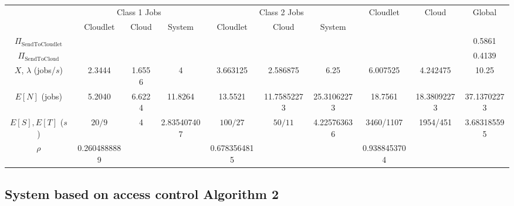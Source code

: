 \documentclass[10pt,a4paper]{article}
\begin{document}
\begin{table}[h!]
    \centering
    \small
    \begin{adjustbox}{center=\textwidth}
     \begin{tabular}{c|c|c|c|c|c|c|c|c|c}

      \toprule
      
      & \multicolumn{3}{c|}{ Class 1 Jobs} & \multicolumn{3}{c|}{Class 2 Jobs} & \multirow{2}{*}{Cloudlet} & \multirow{2}{*}{Cloud} & \multirow{2}{*}{Global} \\ \cline{2-7}
      
      & Cloudlet & Cloud & System & Cloudlet & Cloud & System & \\
      \midrule
      $\Pi_{\text{SendToCloudlet}}$ & & & & & & & & & 0.5861  \\
      \hline
      $\Pi_{\text{SendToCloud}}$ & & & & & & & & & 0.4139  \\
      \hline
	  $X$, $\lambda$ (jobs/$s$) & 2.3444 & 1.6556 & 4 & 3.663125 & 2.586875 & 6.25 & 6.007525 & 4.242475 & 10.25 \\     
      \hline
      $E[N]$ (jobs) & 5.2040 & 6.6224 & 11.8264 & 13.5521 & 11.75852273 & 25.31062273 & 18.7561 & 18.38092273 & 37.13702273 \\
      \hline
      $E[S], E[T]$ ($s$)& $20/9$ & 4 & 2.835407407 & $100/27$ & $50/11$ & 4.225763636 & 3460/1107 & 1954/451 & 3.683185595 \\
      \hline
	  $\rho$ & 0.2604888889 & & & 0.6783564815 & &  & 0.9388453704 & &  \\
     
       
 
     
      \bottomrule

    \end{tabular}
    \end{adjustbox}
\end{table}



\newpage
\subsection{System based on access control Algorithm 2}
\end{document}
